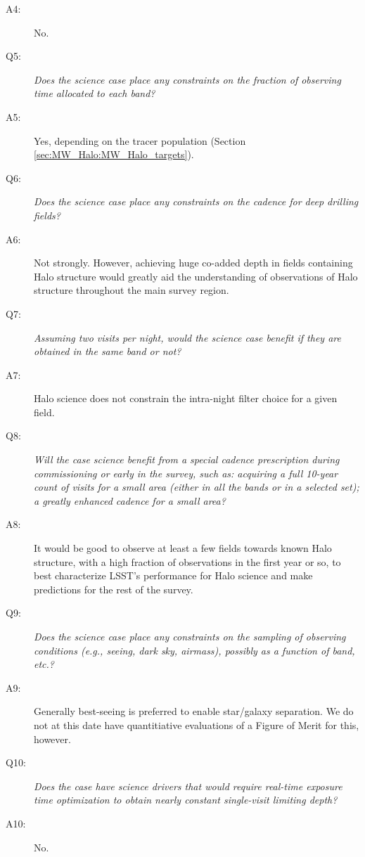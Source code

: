 \begin{description}
\item[A4:] No.

 \item[Q5:] {\it Does the science case place any constraints on the
 fraction of observing time allocated to each band?}

 \item[A5:] Yes, depending on the tracer population (Section \ref{sec:MW_Halo:MW_Halo_targets}).

 \item[Q6:] {\it Does the science case place any constraints on the
 cadence for deep drilling fields?}

\item[A6:] Not strongly. However, achieving huge co-added depth in fields containing Halo structure would greatly aid the understanding of observations of Halo structure throughout the main survey region.

 \item[Q7:] {\it Assuming two visits per night, would the science case
 benefit if they are obtained in the same band or not?}

\item[A7:] Halo science does not constrain the intra-night filter choice for a given field.

 \item[Q8:] {\it Will the case science benefit from a special cadence
 prescription during commissioning or early in the survey, such as:
 acquiring a full 10-year count of visits for a small area (either in all
 the bands or in a  selected set); a greatly enhanced cadence for a small
 area?}

\item[A8:] It would be good to observe at least a few fields towards known Halo structure, with a high fraction of observations in the first year or so, to best characterize LSST's performance for Halo science and make predictions for the rest of the survey.

 \item[Q9:] {\it Does the science case place any constraints on the
 sampling of observing conditions (e.g., seeing, dark sky, airmass),
 possibly as a function of band, etc.?}

\item[A9:] Generally best-seeing is preferred to enable star/galaxy separation. We do not at this date have quantitiative evaluations of a Figure of Merit for this, however.

 \item[Q10:] {\it Does the case have science drivers that would require
 real-time exposure time optimization to obtain nearly constant
 single-visit limiting depth?}

\item[A10:] No.

\end{description}


\navigationbar
